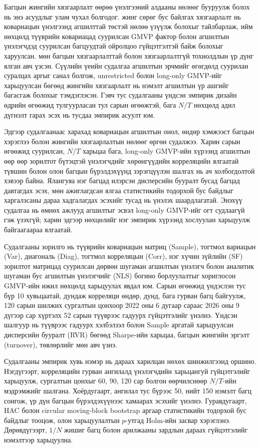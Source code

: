 Багцын жингийн хязгаарлалт өөрөө үнэлгээний алдааны нөлөөг бууруулж болох нь энэ асуудлыг улам чухал болгодог. \citet{JagannathanMa2003} жинг сөрөг бус байлгах хязгаарлалт нь ковариацын үнэлгээнд агшилттай төстэй нөлөө үзүүлж болохыг тайлбарлаж, ийм нөхцөлд түүврийн ковариацад суурилсан GMVP фактор болон агшилтын үнэлэгчдэд суурилсан багцуудтай ойролцоо гүйцэтгэлтэй байж болохыг харуулсан. \citet{ledoitwolf2017} мөн багцын хязгаарлалттай болон хязгаарлалтгүй тохиолдлын үр дүнг ялган авч үзсэн. Сүүлийн үеийн \citet{DeNardKostovic2026} судалгаа агшилтын эрчмийг өгөгдөлд суурилан суралцах аргыг санал болгож, unrestricted болон long-only GMVP-ийг харьцуулсан бөгөөд жингийн хязгаарлалт нь нэмэлт агшилтын үр ашгийг багасгаж болохыг тэмдэглэсэн. Гэвч тус судалгааны үндсэн эмпирик дизайн өдрийн өгөөжид тулгуурласан тул сарын өгөөжтэй, бага $N/T$ нөхцөлд адил дүгнэлт гарах эсэх нь тусдаа эмпирик асуулт юм.

Эдгээр судалгаанаас харахад ковариацын агшилтын онол, өндөр хэмжээст багцын хэрэглээ болон жингийн хязгаарлалтын нөлөөг өргөн судалжээ. Харин сарын өгөөжид суурилсан, $N/T$ харьцаа бага, long-only GMVP-ийн хүрээнд агшилтын өөр өөр зорилтот бүтэцтэй үнэлэгчдийг хөрөнгүүдийн корреляцийн ялгаатай түвшин болон олон багцын бүрэлдэхүүнд зэрэгцүүлэн шалгах нь ач холбогдолтой хэвээр байна. Ялангуяа нэг багцад илэрсэн дисперсийн бууралт бусад багцад давтагдах эсэх, мөн ажиглагдсан ялгаа статистикийн тодорхой бус байдлыг харгалзсаны дараа хадгалагдах эсэхийг тусад нь үнэлэх шаардлагатай. Энэхүү судалгаа нь өмнөх ажлууд агшилтыг эсвэл long-only GMVP-ийг огт судлаагүй гэж үзэхгүй; харин эдгээр нөхцөлийг нэг эмпирик хүрээнд хослуулан харьцуулж байгаагаараа ялгаатай.

Судалгааны зорилго нь түүврийн ковариацын матриц (Sample), тогтмол вариацын (Var), диагональ (Diag), тогтмол корреляцын (Corr), нэг хүчин зүйлийн (SF) зорилтот матрицад суурилсан дөрвөн шугаман агшилтын үнэлэгч болон аналитик шугаман бус агшилтын үнэлэгчийг (NLS) богино борлуулалтыг хориглосон GMVP-ийн ижил нөхцөлд харьцуулах явдал юм. Сарын өгөөжид үндэслэн тус бүр 10 хувьцаатай, дундаж корреляци өндөр, дунд, бага гурван багц байгуулж, 120 сарын шилжих сургалтын цонхоор 2022 оны 6 дугаар сараас 2026 оны 9 дүгээр сар хүртэлх 52 сарын түүврээс гадуурх гүйцэтгэлийг үнэлнэ. Үндсэн шалгуур нь түүврээс гадуурх хэлбэлзэл болон Sample аргатай харьцуулсан дисперсийн бууралт (RVR) бөгөөд Sharpe-ийн харьцаа, багцын жингийн эргэлт (turnover), төвлөрлийг мөн авч үзнэ.

Судалгааны эмпирик хувь нэмэр нь дараах харилцан нөхөх шинжилгээнд оршино. Нэгдүгээрт, корреляцийн гурван ангилалд үнэлэгчдийн харьцангуй гүйцэтгэлийг харьцуулж, сургалтын цонхыг 60, 90, 120 сар болгон өөрчилснөөр $N/T$-ийн мэдрэмжийг шалгана. Хоёрдугаарт, ангилал тус бүрээс 50, нийт 150 нэмэлт багц сонгож, үр дүн багцын бүрэлдэхүүнээс хамаарах эсэхийг үнэлнэ. Гуравдугаарт, HAC болон circular moving-block bootstrap аргаар статистикийн тодорхой бус байдлыг тооцож, олон харьцуулалтын $p$-утгад Holm-ийн засвар хэрэглэнэ. Дөрөвдүгээрт, $1/N$ жишиг багц болон арилжааны зардлын дараах гүйцэтгэлийг нэмэлтээр харьцуулна.

